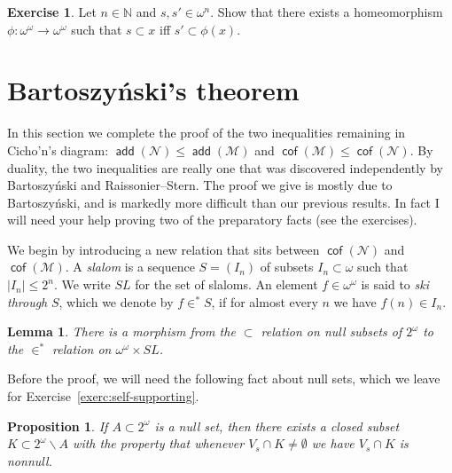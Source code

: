 \documentclass[11pt,oneside]{amsbook}
\newcommand{\NN}{\mathbb N}
\newcommand{\Null}{\mathcal N}
\newcommand{\Meager}{\mathcal M}
\DeclareMathOperator{\add}{\mathsf{add}}
\DeclareMathOperator{\cof}{\mathsf{cof}}
\theoremstyle{definition}
\newtheorem{exerc}{Exercise}[section]
\theoremstyle{plain}
\newtheorem{lem}[thm]{Lemma}
\newtheorem{prop}[thm]{Proposition}
\theoremstyle{definition}
\theoremstyle{remark}
\begin{document}
\begin{exerc}
  \label{exerc:homeo}
  Let $n\in\NN$ and $s,s'\in\omega^n$. Show that there exists a homeomorphism $\phi\colon\omega^\omega\to\omega^\omega$ such that $s\subset x$ iff $s'\subset\phi(x)$.
\end{exerc}



\section{Bartoszy\'nski's theorem}

In this section we complete the proof of the two inequalities remaining in Cicho'n's diagram: $\add(\Null)\leq\add(\Meager)$ and $\cof(\Meager)\leq\cof(\Null)$. By duality, the two inequalities are really one that was discovered independently by Bartoszy\'nski and Raissonier--Stern. The proof we give is mostly due to Bartoszy\'nski, and is markedly more difficult than our previous results. In fact I will need your help proving two of the preparatory facts (see the exercises).

We begin by introducing a new relation that sits between $\cof(\Null)$ and $\cof(\Meager)$. A \emph{slalom} is a sequence $S=(I_n)$ of subsets $I_n\subset\omega$ such that $|I_n|\leq2^n$. We write $SL$ for the set of slaloms. An element $f\in\omega^\omega$ is said to \emph{ski through} $S$, which we denote by $f\in^*S$, if for almost every $n$ we have $f(n)\in I_n$.

\begin{lem}
  \label{lem:null-slalom}
  There is a morphism from the $\subset$ relation on null subsets of $2^\omega$ to the $\in^*$ relation on $\omega^\omega\times SL$.
\end{lem}

Before the proof, we will need the following fact about null sets, which we leave for Exercise~\ref{exerc:self-supporting}.

\begin{prop}
  \label{prop:self-supporting}
  If $A\subset2^\omega$ is a null set, then there exists a closed subset $K\subset2^\omega\smallsetminus A$ with the property that whenever $V_s\cap K\neq\emptyset$ we have $V_s\cap K$ is nonnull.
\end{prop}
\end{document}
